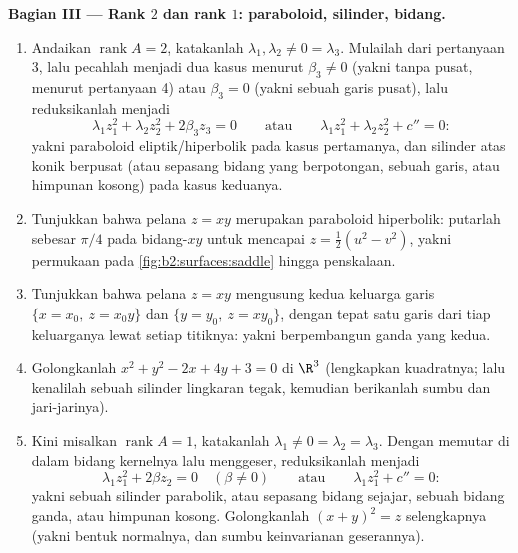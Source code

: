 \begin{problem}
\medskip
\noindent\textbf{Bagian III --- Rank $2$ dan rank $1$:
paraboloid, silinder, bidang.}
\begin{enumerate}[resume]
  \item Andaikan $\operatorname{rank}A = 2$, katakanlah $\lambda_1,
        \lambda_2 \neq 0 = \lambda_3$. Mulailah dari pertanyaan
        3, lalu pecahlah menjadi dua kasus menurut $\beta_3 \neq 0$
        (yakni tanpa pusat, menurut pertanyaan 4) atau $\beta_3 = 0$ (yakni sebuah garis
        pusat), lalu reduksikanlah menjadi
        \[
        \lambda_1z_1^2 + \lambda_2z_2^2 + 2\beta_3z_3 = 0
        \qquad\text{atau}\qquad
        \lambda_1z_1^2 + \lambda_2z_2^2 + c'' = 0 :
        \]
        yakni paraboloid eliptik/hiperbolik pada kasus pertamanya,
        dan silinder atas konik berpusat (atau sepasang
        bidang yang berpotongan, sebuah garis, atau himpunan kosong) pada
        kasus keduanya.
  \item Tunjukkan bahwa pelana $z = xy$ merupakan paraboloid
        hiperbolik: putarlah sebesar $\pi/4$ pada bidang-$xy$ untuk
        mencapai $z = \tfrac12(u^2 - v^2)$, yakni permukaan pada
        \cref{fig:b2:surfaces:saddle} hingga penskalaan.
  \item Tunjukkan bahwa pelana $z = xy$ mengusung kedua keluarga
        garis $\{x = x_0,\ z = x_0y\}$ dan $\{y = y_0,\ z
        = xy_0\}$, dengan tepat satu garis dari tiap keluarganya lewat
        setiap titiknya: yakni  berpembangun ganda yang kedua.
  \item Golongkanlah $x^2 + y^2 - 2x + 4y + 3 = 0$ di $\R^3$
        (lengkapkan kuadratnya; lalu kenalilah sebuah silinder lingkaran
        tegak, kemudian berikanlah sumbu dan jari-jarinya).
  \item Kini misalkan $\operatorname{rank}A = 1$, katakanlah $\lambda_1
        \neq 0 = \lambda_2 = \lambda_3$. Dengan memutar di dalam
        bidang kernelnya lalu menggeser, reduksikanlah menjadi
        \[
        \lambda_1z_1^2 + 2\beta z_2 = 0 \quad (\beta \neq 0)
        \qquad\text{atau}\qquad
        \lambda_1z_1^2 + c'' = 0 :
        \]
        yakni sebuah silinder parabolik, atau sepasang bidang sejajar, sebuah
        bidang ganda, atau himpunan kosong. Golongkanlah $(x + y)^2 =
        z$ selengkapnya (yakni bentuk normalnya, dan sumbu
        keinvarianan geserannya).
\end{enumerate}


\end{problem}
